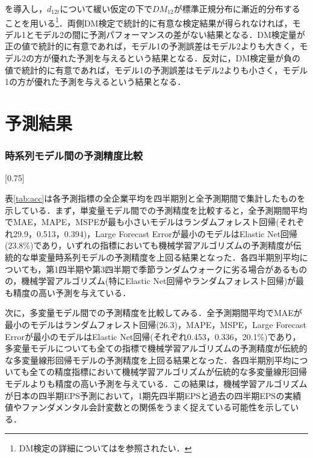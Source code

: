 \documentclass[a4paper，11pt]{jsarticle}
\begin{document}
\noindent
を導入し，$d_{12t}$について緩い仮定の下で$DM_{12}$が標準正規分布に漸近的分布することを用いる\footnote{DM検定の詳細については\cite{diebold2002comparing}を参照されたい．}．両側DM検定で統計的に有意な検定結果が得られなければ，モデル1とモデル2の間に予測パフォーマンスの差がない結果となる．DM検定量が正の値で統計的に有意であれば，モデル1の予測誤差はモデル2よりも大きく，モデル2の方が優れた予測を与えるという結果となる．反対に，DM検定量が負の値で統計的に有意であれば，モデル1の予測誤差はモデル2よりも小さく，モデル1の方が優れた予測を与えるという結果となる．

\part{予測結果} \label{par:result}

\section{時系列モデル間の予測精度比較}

\begin{landscape}
\begin{table}[tbp]
  \caption{時系列モデルによる1期先四半期EPS予測の精度(1,003社平均)}
  \label{tab:acc}
  \scalebox{0.75}[0.75]{
    
  }
\end{table}
\end{landscape}

表\ref{tab:acc}は各予測指標の全企業平均を四半期別と全予測期間で集計したものを示している．まず，単変量モデル間での予測精度を比較すると，全予測期間平均でMAE，MAPE，MSPEが最も小さいモデルはランダムフォレスト回帰(それぞれ29.9，0.513，0.394)，Large Forecast Errorが最小のモデルはElastic Net回帰(23.8\%)であり，いずれの指標においても機械学習アルゴリズムの予測精度が伝統的な単変量時系列モデルの予測精度を上回る結果となった．各四半期別平均についても，第1四半期や第3四半期で季節ランダムウォークに劣る場合があるものの，機械学習アルゴリズム(特にElastic Net回帰やランダムフォレスト回帰)が最も精度の高い予測を与えている．

次に，多変量モデル間での予測精度を比較してみる．全予測期間平均でMAEが最小のモデルはランダムフォレスト回帰(26.3)，MAPE，MSPE，Large Forecast Errorが最小のモデルはElastic Net回帰(それぞれ0.453，0.336，20.1\%)であり，多変量モデルについても全ての指標で機械学習アルゴリズムの予測精度が伝統的な多変量線形回帰モデルの予測精度を上回る結果となった．各四半期別平均についても全ての精度指標において機械学習アルゴリズムが伝統的な多変量線形回帰モデルよりも精度の高い予測を与えている．この結果は，機械学習アルゴリズムが日本の四半期EPS予測において，1期先四半期EPSと過去の四半期EPSの実績値やファンダメンタル会計変数との関係をうまく捉えている可能性を示している．
\end{document}
